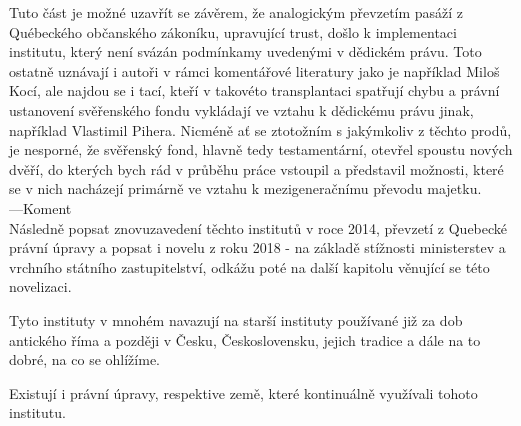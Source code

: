 \documentclass{article}
\begin{document}
Tuto část je možné uzavřít se závěrem, že analogickým převzetím pasáží z Québeckého občanského zákoníku, upravující trust, došlo k implementaci institutu, který není svázán podmínkamy uvedenými v dědickém právu. Toto ostatně uznávají i autoři v rámci komentářové literatury jako je například Miloš Kocí, ale najdou se i tací, kteří v takovéto transplantaci spatřují chybu a právní ustanovení svěřenského fondu vykládají ve vztahu k dědickému právu jinak, například Vlastimil Pihera. Nicméně ať se ztotožním s jakýmkoliv z těchto prodů, je nesporné, že svěřenský fond, hlavně tedy testamentární, otevřel spoustu nových dvěří, do kterých bych rád v průběhu práce vstoupil a představil možnosti, které se v nich nacházejí primárně ve vztahu k mezigeneračnímu převodu majetku.\\



---Koment\\
 Následně popsat znovuzavedení těchto institutů v roce 2014, převzetí z Quebecké právní úpravy a popsat i novelu z roku 2018 - na základě stížnosti ministerstev a vrchního státního zastupitelství, odkážu poté na další kapitolu věnující se této novelizaci.
 
 Tyto instituty v mnohém navazují na starší instituty používané již za dob antického říma a později v Česku, Československu, jejich tradice a dále na to dobré, na co se ohlížíme.
 
 Existují i právní úpravy, respektive země, které kontinuálně využívali tohoto institutu.\\
 
\end{document}
